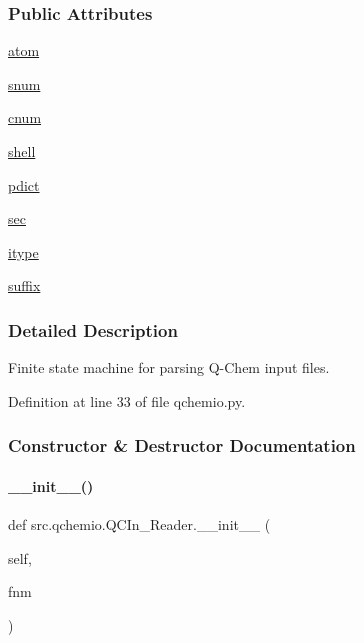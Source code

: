 \subsubsection*{Public Attributes}
\begin{DoxyCompactItemize}
\item 
\hyperlink{classsrc_1_1qchemio_1_1QCIn__Reader_a05c4ce2f859233dece0971c87650cd37}{atom}
\item 
\hyperlink{classsrc_1_1qchemio_1_1QCIn__Reader_a1910683ed769b0f3cf81f9af5f9bfa2d}{snum}
\item 
\hyperlink{classsrc_1_1qchemio_1_1QCIn__Reader_a0ad7983bdfe4ac600a799be449440636}{cnum}
\item 
\hyperlink{classsrc_1_1qchemio_1_1QCIn__Reader_af158d3d3738b2e29909a24922e06de8e}{shell}
\item 
\hyperlink{classsrc_1_1qchemio_1_1QCIn__Reader_aeb3eb1ac64595e77c0425c773b05ad49}{pdict}
\item 
\hyperlink{classsrc_1_1qchemio_1_1QCIn__Reader_aba4ef6d28b0424987d04669425fb66bc}{sec}
\item 
\hyperlink{classsrc_1_1qchemio_1_1QCIn__Reader_abd38c3f4eff3b247ffc7af1cecae0590}{itype}
\item 
\hyperlink{classsrc_1_1qchemio_1_1QCIn__Reader_a4ebe889e7d9eaeb9169d139b33455087}{suffix}
\end{DoxyCompactItemize}


\subsubsection{Detailed Description}
Finite state machine for parsing Q-\/\+Chem input files. 

Definition at line 33 of file qchemio.\+py.



\subsubsection{Constructor \& Destructor Documentation}
\mbox{\label{classsrc_1_1qchemio_1_1QCIn__Reader_a927758b19f88fe6e3bdef301cb46a74d}} 
\paragraph{\texorpdfstring{\+\_\+\+\_\+init\+\_\+\+\_\+()}{\_\_init\_\_()}}
{\footnotesize\ttfamily def src.\+qchemio.\+Q\+C\+In\+\_\+\+Reader.\+\_\+\+\_\+init\+\_\+\+\_\+ (\begin{DoxyParamCaption}\item[{}]{self,  }\item[{}]{fnm }\end{DoxyParamCaption})}



